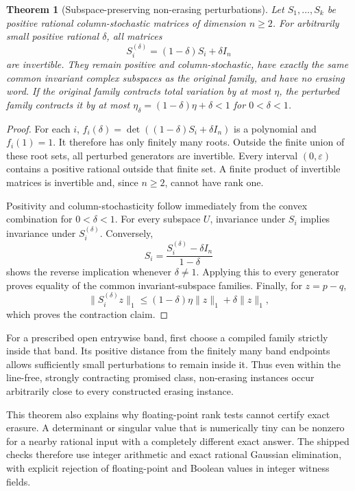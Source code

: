 \documentclass[11pt,letterpaper]{article}
\newtheorem{theorem}{Theorem}[section]
\theoremstyle{definition}
\theoremstyle{remark}
\begin{document}
\begin{theorem}[Subspace-preserving non-erasing perturbations]\label{ste:ee:thm:perturb}
Let $S_1,\ldots,S_k$ be positive rational column-stochastic matrices of dimension
$n\geq2$. For arbitrarily small positive rational $\delta$, all matrices
\begin{equation}
 S_i^{(\delta)}=(1-\delta)S_i+\delta I_n
 \label{ste:ee:eq:perturb}
\end{equation}
are invertible. They remain positive and column-stochastic, have exactly the
same common invariant complex subspaces as the original family, and have no
erasing word. If the original family contracts total variation by at most
$\eta$, the perturbed family contracts it by at most
$\eta_\delta=(1-\delta)\eta+\delta<1$ for $0<\delta<1$.
\end{theorem}
\begin{proof}
For each $i$, $f_i(\delta)=\det((1-\delta)S_i+\delta I_n)$ is a polynomial and
$f_i(1)=1$. It therefore has only finitely many roots. Outside the finite union
of these root sets, all perturbed generators are invertible. Every interval
$(0,\varepsilon)$ contains a positive rational outside that finite set.
A finite product of invertible matrices is invertible and, since $n\geq2$,
cannot have rank one.

Positivity and column-stochasticity follow immediately from the convex
combination for $0<\delta<1$. For every subspace $U$, invariance under $S_i$
implies invariance under $S_i^{(\delta)}$. Conversely,
\[
 S_i=\frac{S_i^{(\delta)}-\delta I_n}{1-\delta}
\]
shows the reverse implication whenever $\delta\ne1$. Applying this to every
generator proves equality of the common invariant-subspace families.
Finally, for $z=p-q$,
\[
 \|S_i^{(\delta)}z\|_1
 \leq(1-\delta)\eta\|z\|_1+\delta\|z\|_1,
\]
which proves the contraction claim.
\end{proof}

For a prescribed open entrywise band, first choose a compiled family strictly
inside that band. Its positive distance from the finitely many band endpoints
allows sufficiently small perturbations to remain inside it. Thus even within
the line-free, strongly contracting promised class, non-erasing instances occur
arbitrarily close to every constructed erasing instance.

This theorem also explains why floating-point rank tests cannot certify exact
erasure. A determinant or singular value that is numerically tiny can be nonzero
for a nearby rational input with a completely different exact answer. The shipped
checks therefore use integer arithmetic and exact rational Gaussian elimination,
with explicit rejection of floating-point and Boolean values in integer witness
fields.
\end{document}
